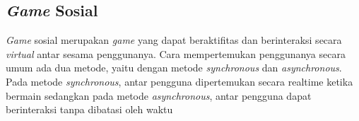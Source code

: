 \subsection{\textit{Game} Sosial}
\noindent

\textit{\textit{Game}} sosial merupakan \textit{\textit{game}} yang dapat beraktifitas dan 
berinteraksi secara \textit{virtual} antar sesama penggunanya. Cara 
mempertemukan penggunanya secara umum ada dua metode, 
yaitu dengan metode \textit{synchronous} dan \textit{asynchronous}. Pada 
metode \textit{synchronous}, antar pengguna dipertemukan secara 
realtime ketika bermain sedangkan pada metode \textit{asynchronous}, 
antar pengguna dapat berinteraksi tanpa dibatasi oleh waktu


